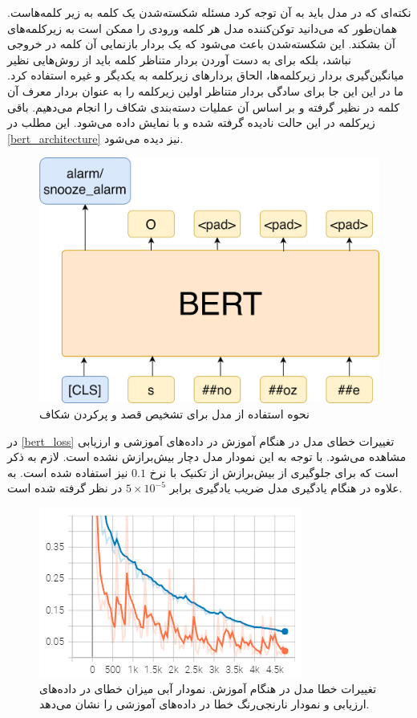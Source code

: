 \documentclass[12pt, a4paper]{book}
\begin{document}
نکته‌ای که در مدل  باید به آن توجه کرد مسئله شکسته‌شدن یک کلمه به زیر کلمه‌هاست. همان‌طور که می‌دانید
توکن‌کننده مدل  هر کلمه ورودی را ممکن است به زیرکلمه‌های آن بشکند. این شکسته‌شدن باعث می‌شود که
یک بردار بازنمایی آن کلمه در خروجی نباشد، بلکه برای به دست آوردن بردار متناظر کلمه باید از روش‌هایی نظیر
میانگین‌گیری بردار زیرکلمه‌ها، الحاق بردار‌های زیرکلمه به یکدیگر و غیره استفاده کرد. ما در این این جا برای سادگی
بردار متناظر اولین زیرکلمه را به عنوان بردار معرف آن کلمه در نظیر گرفته و بر اساس آن عملیات دسته‌بندی
شکاف‌ را انجام می‌دهیم. باقی زیرکلمه‌ در این حالت نادیده گرفته شده و با  نمایش داده می‌شود.
این مطلب در \autoref{bert_architecture} نیز دیده می‌شود.

\begin{figure}[h]
    \centering
    \includegraphics[width=0.5\linewidth]{images/bert/architecture.png}
    \caption{نحوه استفاده از مدل  برای تشخیص قصد و پرکردن شکاف}
    \label{bert_architecture}
\end{figure}

در \autoref{bert_loss} تغییرات خطای مدل در هنگام آموزش در داده‌های آموزشی و ارزیابی مشاهده می‌شود.
با توجه به این نمودار مدل دچار بیش‌برازش نشده است. لازم به ذکر است که برای جلوگیری از بیش‌برازش
از تکنیک  با نرخ $0.1$ نیز استفاده شده است. به علاوه در هنگام یادگیری مدل ضریب یادگیری
برابر $5 \times 10^{-5}$ در نظر گرفته شده است.

\begin{figure}[h]
    \centering
    \includegraphics[width=0.5\linewidth]{images/bert/loss.png}
    \caption{تغییرات خطا مدل در هنگام آموزش. نمودار آبی میزان خطای در داده‌های ارزیابی و نمودار نارنجی‌رنگ خطا در داده‌های آموزشی را نشان می‌دهد. }
    \label{bert_loss}
\end{figure}
\end{document}
